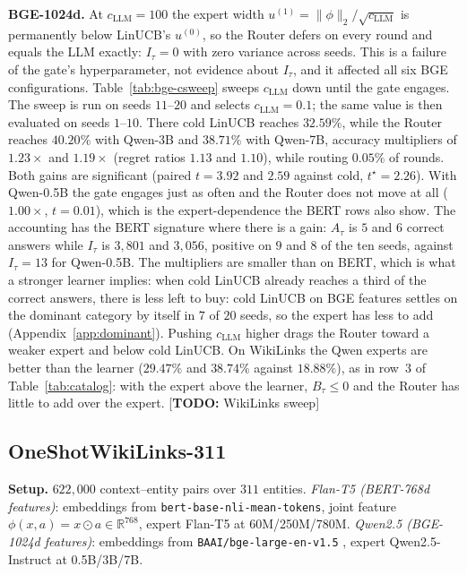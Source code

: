 \documentclass[anon]{alt2027} %
\newcommand{\todo}[1]{\textcolor{red!70!black}{[\textbf{TODO:} #1]}}
\begin{document}
\textbf{BGE-1024d.} At $c_{\mathrm{LLM}}=100$ the expert width $u^{(1)}=\|\phi\|_2/\sqrt{c_{\mathrm{LLM}}}$
is permanently below LinUCB's $u^{(0)}$, so the Router defers on every round
and equals the LLM exactly: $I_\tau=0$ with zero variance across seeds. This
is a failure of the gate's hyperparameter, not evidence about $I_\tau$, and it
affected all six BGE configurations. Table~\ref{tab:bge-csweep} sweeps $c_{\mathrm{LLM}}$
down until the gate engages. The sweep is run on seeds $11$--$20$ and selects
$c_{\mathrm{LLM}}=0.1$; the same value is then evaluated on seeds $1$--$10$. There cold LinUCB
reaches $32.59\%$, while the Router reaches $40.20\%$ with Qwen-3B and
$38.71\%$ with Qwen-7B, accuracy multipliers of $1.23\times$ and $1.19\times$
(regret ratios $1.13$ and $1.10$), while routing $0.05\%$ of rounds. Both gains
are significant (paired $t=3.92$ and $2.59$ against cold, $t^\star=2.26$). With
Qwen-0.5B the gate engages just as often and the Router does not move at all
($1.00\times$, $t=0.01$), which is the expert-dependence the BERT rows also
show. The accounting has the BERT signature where there is a gain: $A_\tau$ is
$5$ and $6$ correct answers while $I_\tau$ is $3{,}801$ and $3{,}056$, positive
on $9$ and $8$ of the ten seeds, against $I_\tau=13$ for Qwen-0.5B. The
multipliers are smaller than on BERT, which is what a stronger learner implies:
when cold LinUCB already reaches a third of the correct answers, there is less
left to buy: cold LinUCB on BGE features settles on the dominant category
by itself in $7$ of $20$ seeds, so the expert has less to add
(Appendix~\ref{app:dominant}). Pushing $c_{\mathrm{LLM}}$ higher
drags the Router toward a weaker expert and below cold LinUCB. On WikiLinks
the Qwen experts are better than the learner ($29.47\%$ and $38.74\%$ against
$18.88\%$), as in row~3 of Table~\ref{tab:catalog}: with the expert above the
learner, $B_\tau\le0$ and the Router has little to add over the expert. \todo{WikiLinks sweep}

\subsection{OneShotWikiLinks-311}
\label{app:wiki}

\textbf{Setup.} $622{,}000$ context--entity pairs over $311$ entities.
\emph{Flan-T5 (BERT-768d features)}: embeddings from
\texttt{bert-base-nli-mean-tokens}, joint feature $\phi(x,a)=x\odot a\in\mathbb R^{768}$,
expert Flan-T5 \citep{chung2024scaling} at 60M/250M/780M.
\emph{Qwen2.5 (BGE-1024d features)}: embeddings from
\texttt{BAAI/bge-large-en-v1.5} \citep{xiao2024c}, expert Qwen2.5-Instruct
\citep{hui2024qwen2} at 0.5B/3B/7B.
\end{document}
